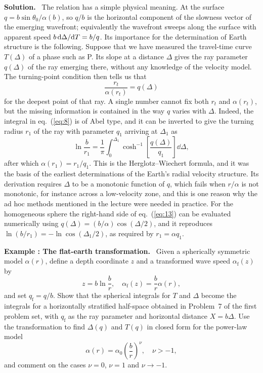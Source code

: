 \documentclass[a4paper,12pt]{paper}
\newcounter{example}
\renewenvironment{example}[1]{%
  \refstepcounter{example}%
  \begin{mdframed}[linewidth=1pt,innertopmargin=6pt,innerbottommargin=6pt]%
  \noindent\textbf{Example \theexample: #1.}\ }{%
  \end{mdframed}}
\newenvironment{solution}{\par\noindent\textbf{Solution.}\ }{\par\medskip}
\begin{document}
\begin{solution}
The relation has a simple physical meaning. At the surface $q=b\sin\theta_{0}/\alpha(b)$, so
$q/b$ is the horizontal component of the slowness vector of the emerging wavefront; equivalently
the wavefront sweeps along the surface with apparent speed $b\,\mathrm{d}\Delta/\mathrm{d} T=b/q$.
Its importance for the determination of Earth structure is the following. Suppose that
we have measured the travel-time curve $T(\Delta)$ of a phase such as P. Its slope at a distance
$\Delta$ gives the ray parameter $q(\Delta)$ of the ray emerging there, without any knowledge of
the velocity model. The turning-point condition then tells us that
\begin{equation}
\frac{r_{t}}{\alpha(r_{t})}=q(\Delta)
\label{eq:12}
\end{equation}
for the deepest point of that ray. A single number cannot fix both $r_{t}$ and $\alpha(r_{t})$,
but the missing information is contained in the way $q$ varies with $\Delta$. Indeed, the
integral in eq.~(\ref{eq:8}) is of Abel type, and it can be inverted to give the turning radius
$r_{1}$ of the ray with parameter $q_{1}$ arriving at $\Delta_{1}$ as
\begin{equation}
\ln\frac{b}{r_{1}}=\frac{1}{\pi}\int_{0}^{\Delta_{1}}\cosh^{-1}\left[\frac{q(\Delta)}{q_{1}}\right]\dd\Delta,
\label{eq:13}
\end{equation}
after which $\alpha(r_{1})=r_{1}/q_{1}$. This is the Herglotz--Wiechert formula, and it was the
basis of the earliest determinations of the Earth's radial velocity structure. Its derivation
requires $\Delta$ to be a monotonic function of $q$, which fails when $r/\alpha$ is not
monotonic, for instance across a low-velocity zone, and this is one reason why the ad hoc
methods mentioned in the lecture were needed in practice. For the homogeneous sphere the
right-hand side of eq.~(\ref{eq:13}) can be evaluated numerically using
$q(\Delta)=(b/\alpha)\cos(\Delta/2)$, and it reproduces $\ln(b/r_{1})=-\ln\cos(\Delta_{1}/2)$,
as required by $r_{1}=\alpha q_{1}$.
\end{solution}

\begin{example}{The flat-earth transformation}
Given a spherically symmetric model $\alpha(r)$, define a depth coordinate $z$ and a
transformed wave speed $\alpha_{\mathrm{f}}(z)$ by
\begin{equation*}
z=b\ln\frac{b}{r},\quad \alpha_{\mathrm{f}}(z)=\frac{b}{r}\alpha(r),
\end{equation*}
and set $q_{\mathrm{f}}=q/b$. Show that the spherical integrals for $T$ and $\Delta$ become the
integrals for a horizontally stratified half-space obtained in Problem~7 of the first problem
set, with $q_{\mathrm{f}}$ as the ray parameter and horizontal distance $X=b\Delta$. Use the
transformation to find $\Delta(q)$ and $T(q)$ in closed form for the power-law model
\begin{equation*}
\alpha(r)=\alpha_{0}\left(\frac{b}{r}\right)^{\nu},\quad \nu>-1,
\end{equation*}
and comment on the cases $\nu=0$, $\nu=1$ and $\nu\to-1$.
\end{example}
\end{document}

